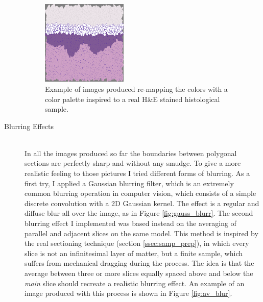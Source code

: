\documentclass[12pt,a4paper]{report}
\begin{document}
\begin{description}
        \begin{figure}
            \centering
            \includegraphics[width = 0.4\textwidth]{images/derma_slice}
            \caption{Example of images produced re-mapping the colors with a color palette inspired to a real H\&E stained histological sample.}
            \label{fig:derma_slice}
        \end{figure}

        \item [Blurring Effects] \hfill \\
        In all the images produced so far the boundaries between polygonal sections are perfectly sharp and without any smudge. To give a more realistic feeling to those pictures I tried different forms of blurring. As a first try, I applied a Gaussian blurring filter, which is an extremely common blurring operation in computer vision, which consists of a simple discrete convolution with a 2D Gaussian kernel. The effect is a regular and diffuse blur all over the image, as in Figure \ref{fig:gauss_blurr}. The second blurring effect I implemented was based instead on the averaging of parallel and adjacent slices on the same model. This method is inspired by the real sectioning technique (section \ref{ssec:samp_prep}), in which every slice is not an infinitesimal layer of matter, but a finite sample, which suffers from mechanical dragging during the process. The idea is that the average between three or more slices equally spaced above and below the \textit{main} slice should recreate a realistic blurring effect. An example of an image produced with this process is shown in Figure \ref{fig:av_blur}.


\end{description}
\end{document}
